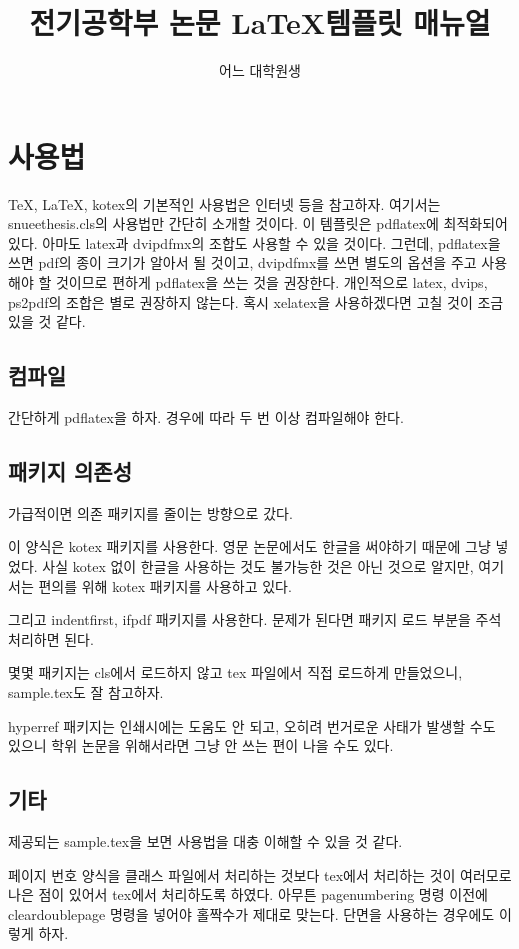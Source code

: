 \documentclass[a4paper]{report}
\title{전기공학부 논문 \LaTeX 템플릿 매뉴얼}
\author{어느 대학원생}
\begin{document}
\maketitle

\tableofcontents

\chapter{사용법}
\TeX, \LaTeX, kotex의 기본적인 사용법은 인터넷 등을 참고하자.
여기서는 snueethesis.cls의 사용법만 간단히 소개할 것이다.
이 템플릿은 pdflatex에 최적화되어 있다.
아마도 latex과 dvipdfmx의 조합도 사용할 수 있을 것이다.
그런데, pdflatex을 쓰면 pdf의 종이 크기가 알아서
될 것이고, dvipdfmx를 쓰면 별도의 옵션을 주고 사용해야 할 것이므로
편하게 pdflatex을 쓰는 것을 권장한다.
개인적으로 latex, dvips, ps2pdf의 조합은 별로 권장하지 않는다.
혹시 xelatex을 사용하겠다면 고칠 것이 조금 있을 것 같다.
\section{컴파일}
간단하게 pdflatex을 하자. 경우에 따라 두 번 이상 컴파일해야 한다.
\section{패키지 의존성}
가급적이면 의존 패키지를 줄이는 방향으로 갔다.

이 양식은 kotex 패키지를 사용한다.
영문 논문에서도 한글을 써야하기 때문에 그냥 넣었다.
사실 kotex 없이 한글을 사용하는 것도 불가능한 것은
아닌 것으로 알지만, 여기서는 편의를 위해 kotex 패키지를 사용하고 있다.

그리고 indentfirst, ifpdf 패키지를 사용한다.
문제가 된다면 패키지 로드 부분을 주석처리하면 된다.

몇몇 패키지는 cls에서 로드하지 않고 tex 파일에서
직접 로드하게 만들었으니, sample.tex도 잘 참고하자.

hyperref 패키지는 인쇄시에는 도움도
안 되고, 오히려 번거로운 사태가 발생할 수도 있으니
학위 논문을 위해서라면 그냥 안 쓰는 편이
나을 수도 있다.
\section{기타}
제공되는 sample.tex을 보면
사용법을 대충 이해할 수 있을 것 같다.

페이지 번호 양식을
클래스 파일에서 처리하는 것보다 tex에서
처리하는 것이 여러모로 나은 점이
있어서 tex에서 처리하도록 하였다.
아무튼 pagenumbering 명령 이전에
cleardoublepage 명령을 넣어야
홀짝수가 제대로 맞는다.
단면을 사용하는 경우에도 이렇게 하자.
\end{document}
